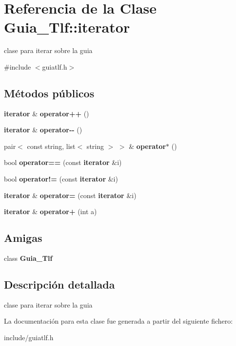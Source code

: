 \section{Referencia de la Clase Guia\+\_\+\+Tlf\+:\+:iterator}
\label{classGuia__Tlf_1_1iterator}


clase para iterar sobre la guia  




{\ttfamily \#include $<$guiatlf.\+h$>$}

\subsection*{Métodos públicos}
\begin{DoxyCompactItemize}
\item 
{\bf iterator} \& {\bfseries operator++} ()\label{classGuia__Tlf_1_1iterator_a4edb22003e51ce05bb2be0e0f0f9334d}

\item 
{\bf iterator} \& {\bfseries operator-\/-\/} ()\label{classGuia__Tlf_1_1iterator_a40654c62e5d7fa0c88f41cc8248cba44}

\item 
pair$<$ const string, list$<$ string $>$ $>$ \& {\bfseries operator$\ast$} ()\label{classGuia__Tlf_1_1iterator_ac0f46a9c675378d6e9c41abffcc9b355}

\item 
bool {\bfseries operator==} (const {\bf iterator} \&i)\label{classGuia__Tlf_1_1iterator_ab4b046aff7151ba197b789091b65aa49}

\item 
bool {\bfseries operator!=} (const {\bf iterator} \&i)\label{classGuia__Tlf_1_1iterator_aa7f7981ca6aec075d47618b136904682}

\item 
{\bf iterator} \& {\bfseries operator=} (const {\bf iterator} \&i)\label{classGuia__Tlf_1_1iterator_a5fb15345776270604fbcb3e4f71407b7}

\item 
{\bf iterator} \& {\bfseries operator+} (int a)\label{classGuia__Tlf_1_1iterator_afaecefee259ceba5f30ab7b838de84a6}

\end{DoxyCompactItemize}
\subsection*{Amigas}
\begin{DoxyCompactItemize}
\item 
class {\bfseries Guia\+\_\+\+Tlf}\label{classGuia__Tlf_1_1iterator_a4349d7a1b26a0aa94447235f95b2f940}

\end{DoxyCompactItemize}


\subsection{Descripción detallada}
clase para iterar sobre la guia 

La documentación para esta clase fue generada a partir del siguiente fichero\+:\begin{DoxyCompactItemize}
\item 
include/guiatlf.\+h\end{DoxyCompactItemize}

